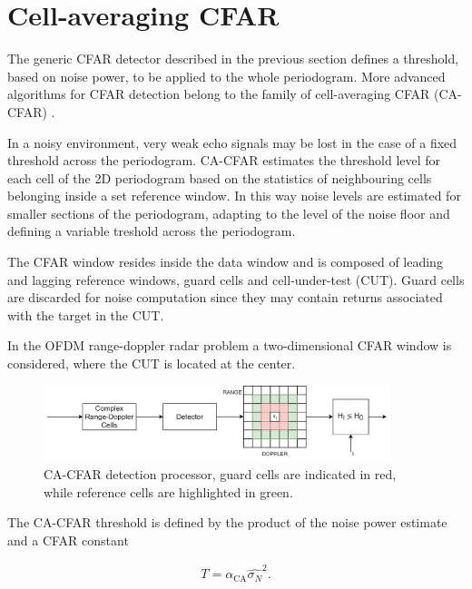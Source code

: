 \section{Cell-averaging CFAR}
\label{sec:cell averaging CFAR}

The generic CFAR detector described in the previous section defines a threshold, based on noise power, to be applied to the whole periodogram. More advanced algorithms for CFAR detection belong to the family of cell-averaging CFAR (CA-CFAR) \cite{Richards_2014}.

In a noisy environment, very weak echo signals may be lost in the case of a fixed threshold across the periodogram. CA-CFAR estimates the threshold level for each cell of the 2D periodogram based on the statistics of neighbouring cells belonging inside a set reference window. In this way noise levels are estimated for smaller sections of the periodogram, adapting to the level of the noise floor and defining a variable treshold across the periodogram.

The CFAR window resides inside the data window and is composed of leading and lagging reference windows, guard cells and cell-under-test (CUT). Guard cells are discarded for noise computation since they may contain returns associated with the target in the CUT.

In the OFDM range-doppler radar problem a two-dimensional CFAR window is considered, where the CUT is located at the center.

\begin{figure}[H]
	\centering
	\includegraphics[width=0.9\textwidth]{Images/radar_detect_threshold/cacfar_pipeline.png}
	\caption{CA-CFAR detection processor, guard cells are indicated in red, while reference cells are highlighted in green.}
	\label{fig:cacfar_pipeline}
\end{figure}



The CA-CFAR threshold is defined by the product of the noise power estimate and a CFAR constant

\begin{align}
	T = \alpha_{\text{CA}} \hat{\sigma_N}^2.
\end{align}

